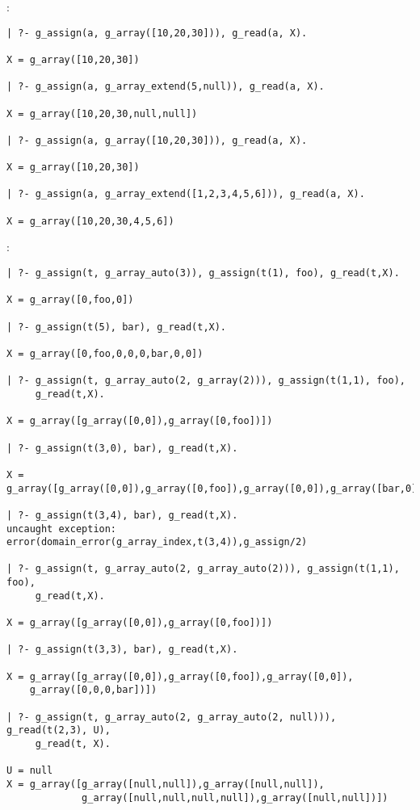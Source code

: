 :

\begin{Indentation}
\begin{verbatim}
| ?- g_assign(a, g_array([10,20,30])), g_read(a, X).

X = g_array([10,20,30])

| ?- g_assign(a, g_array_extend(5,null)), g_read(a, X).

X = g_array([10,20,30,null,null])

| ?- g_assign(a, g_array([10,20,30])), g_read(a, X).

X = g_array([10,20,30])

| ?- g_assign(a, g_array_extend([1,2,3,4,5,6])), g_read(a, X).

X = g_array([10,20,30,4,5,6])
\end{verbatim}
\end{Indentation}

:

\begin{Indentation}
\begin{verbatim}
| ?- g_assign(t, g_array_auto(3)), g_assign(t(1), foo), g_read(t,X).

X = g_array([0,foo,0])

| ?- g_assign(t(5), bar), g_read(t,X).                              

X = g_array([0,foo,0,0,0,bar,0,0])

| ?- g_assign(t, g_array_auto(2, g_array(2))), g_assign(t(1,1), foo), 
     g_read(t,X).

X = g_array([g_array([0,0]),g_array([0,foo])])

| ?- g_assign(t(3,0), bar), g_read(t,X).

X = g_array([g_array([0,0]),g_array([0,foo]),g_array([0,0]),g_array([bar,0])])

| ?- g_assign(t(3,4), bar), g_read(t,X).
uncaught exception: error(domain_error(g_array_index,t(3,4)),g_assign/2)

| ?- g_assign(t, g_array_auto(2, g_array_auto(2))), g_assign(t(1,1), foo), 
     g_read(t,X).

X = g_array([g_array([0,0]),g_array([0,foo])])

| ?- g_assign(t(3,3), bar), g_read(t,X).

X = g_array([g_array([0,0]),g_array([0,foo]),g_array([0,0]),
    g_array([0,0,0,bar])])

| ?- g_assign(t, g_array_auto(2, g_array_auto(2, null))), g_read(t(2,3), U),
     g_read(t, X).

U = null
X = g_array([g_array([null,null]),g_array([null,null]),
             g_array([null,null,null,null]),g_array([null,null])])
\end{verbatim}
\end{Indentation}

